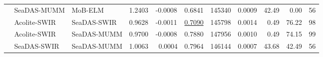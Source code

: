 \begin{table}[!ht]
\begin{tabular}{cllcccccccc}
      &   SeaDAS-MUMM   &  MoB-ELM      & 1.2403  & -0.0008 & 0.6841  & 145340  & 0.0009  &  42.49      & ~0.00            &   56      \\ 
      &   Acolite-SWIR  &  SeaDAS-SWIR  & 0.9628  & -0.0011 & \underline{0.7090}  & 145798  & 0.0014  &  ~0.49      & 76.22            &   98      \\
      &   Acolite-SWIR  &  SeaDAS-MUMM  & 0.9700  & -0.0008 & 0.7880  & 147956  & 0.0010  &  ~0.49      & 74.15            &   99      \\
      &   SeaDAS-SWIR   &  SeaDAS-MUMM  & 1.0063  & ~0.0004 & 0.7964  & 146144  & 0.0007  &  43.68      & 42.49            &   56      \\
 \end{tabular}
\end{table}
